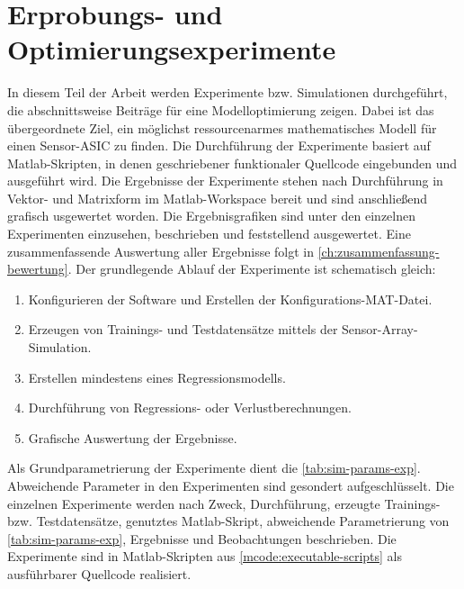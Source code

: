 %

\chapter{Erprobungs- und Optimierungsexperimente}\label{ch:erprobungs-u-opt-exp}


In diesem Teil der Arbeit werden Experimente bzw. Simulationen durchgeführt, die abschnittsweise Beiträge für eine Modelloptimierung zeigen. Dabei ist das übergeordnete Ziel, ein möglichst ressourcenarmes mathematisches Modell für einen Sensor-ASIC zu finden. Die Durchführung der Experimente basiert auf Matlab-Skripten, in denen geschriebener funktionaler Quellcode eingebunden und ausgeführt wird. Die Ergebnisse der Experimente stehen nach Durchführung in Vektor- und Matrixform im Matlab-Workspace bereit und sind anschließend grafisch usgewertet worden. Die Ergebnisgrafiken sind unter den einzelnen Experimenten einzusehen, beschrieben und feststellend ausgewertet. Eine zusammenfassende Auswertung aller Ergebnisse folgt in \autoref{ch:zusammenfassung-bewertung}. Der grundlegende Ablauf der Experimente ist schematisch gleich:


\begin{enumerate}
	\item Konfigurieren der Software und Erstellen der Konfigurations-MAT-Datei.
	\item Erzeugen von Trainings- und Testdatensätze mittels der Sensor-Array-Simulation.
	\item Erstellen mindestens eines Regressionsmodells.
	\item Durchführung von Regressions- oder Verlustberechnungen.
	\item Grafische Auswertung der Ergebnisse.
\end{enumerate}


Als Grundparametrierung der Experimente dient die \autoref{tab:sim-params-exp}. Abweichende Parameter in den Experimenten sind gesondert aufgeschlüsselt. Die einzelnen Experimente werden nach Zweck, Durchführung, erzeugte Trainings- bzw. Testdatensätze, genutztes Matlab-Skript, abweichende Parametrierung von \autoref{tab:sim-params-exp}, Ergebnisse und Beobachtungen beschrieben. Die Experimente sind in Matlab-Skripten aus \autoref{mcode:executable-scripts} als ausführbarer Quellcode realisiert.


\clearpage


